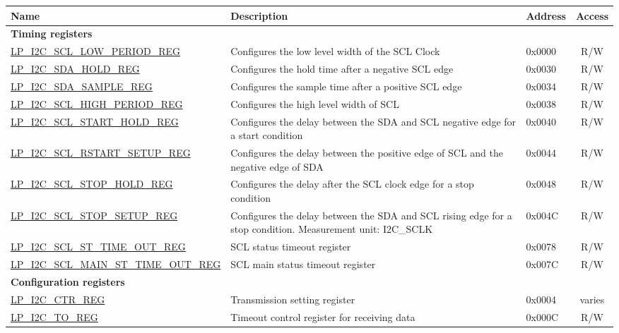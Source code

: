 \begin{longtable}{ | p{6.1cm} | p{6.8cm} | p{1.3cm} | c | }
\hline\rowcolor{lightgray}
\textbf{Name} & \textbf{Description} &  \textbf{Address} & \textbf{Access} \\ \hline
\endhead
\multicolumn{4}{|l|}{\textbf{Timing registers}} \\ \hline
\hyperref[regdesc:LPI2CSCLLOWPERIODREG]{LP\_I2C\_SCL\_LOW\_PERIOD\_REG} & Configures the low level width of the SCL Clock & 0x0000 & R/W \\ \hline
\hyperref[regdesc:LPI2CSDAHOLDREG]{LP\_I2C\_SDA\_HOLD\_REG} & Configures the hold time after a negative SCL edge & 0x0030 & R/W \\ \hline
\hyperref[regdesc:LPI2CSDASAMPLEREG]{LP\_I2C\_SDA\_SAMPLE\_REG} & Configures the sample time after a positive SCL edge & 0x0034 & R/W \\ \hline
\hyperref[regdesc:LPI2CSCLHIGHPERIODREG]{LP\_I2C\_SCL\_HIGH\_PERIOD\_REG} & Configures the high level width of SCL & 0x0038 & R/W \\ \hline
\hyperref[regdesc:LPI2CSCLSTARTHOLDREG]{LP\_I2C\_SCL\_START\_HOLD\_REG} & Configures the delay between the SDA and SCL negative edge for a start condition & 0x0040 & R/W \\ \hline
\hyperref[regdesc:LPI2CSCLRSTARTSETUPREG]{LP\_I2C\_SCL\_RSTART\_SETUP\_REG} & Configures the delay between the positive edge of SCL and the negative edge of SDA & 0x0044 & R/W \\ \hline
\hyperref[regdesc:LPI2CSCLSTOPHOLDREG]{LP\_I2C\_SCL\_STOP\_HOLD\_REG} & Configures the delay after the SCL clock edge for a stop condition & 0x0048 & R/W \\ \hline
\hyperref[regdesc:LPI2CSCLSTOPSETUPREG]{LP\_I2C\_SCL\_STOP\_SETUP\_REG} & Configures the delay between the SDA and SCL rising edge for a stop condition. Measurement unit: I2C\_SCLK & 0x004C & R/W \\ \hline
\hyperref[regdesc:LPI2CSCLSTTIMEOUTREG]{LP\_I2C\_SCL\_ST\_TIME\_OUT\_REG} & SCL status timeout register & 0x0078 & R/W \\ \hline
\hyperref[regdesc:LPI2CSCLMAINSTTIMEOUTREG]{LP\_I2C\_SCL\_MAIN\_ST\_TIME\_OUT\_REG} & SCL main status timeout register & 0x007C & R/W \\ \hline
\multicolumn{4}{|l|}{\textbf{Configuration registers}} \\ \hline
\hyperref[regdesc:LPI2CCTRREG]{LP\_I2C\_CTR\_REG} & Transmission setting register & 0x0004 & varies \\ \hline
\hyperref[regdesc:LPI2CTOREG]{LP\_I2C\_TO\_REG} & Timeout control register for receiving data & 0x000C & R/W \\ \hline

\end{longtable}
